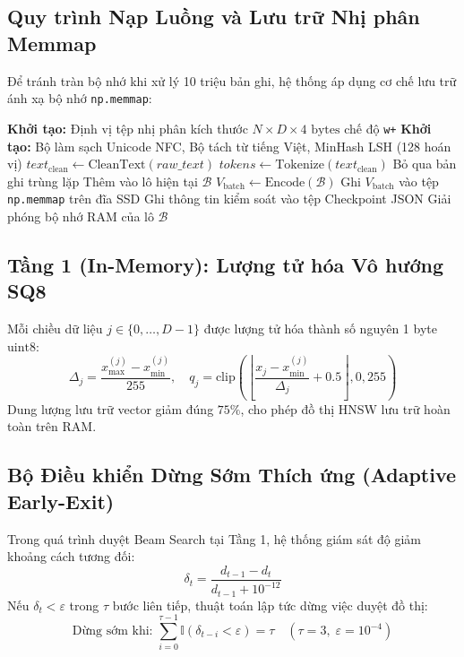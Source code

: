 \documentclass[12pt,a4paper]{article}
\begin{document}
\subsection{Quy trình Nạp Luồng và Lưu trữ Nhị phân Memmap}
Để tránh tràn bộ nhớ khi xử lý 10 triệu bản ghi, hệ thống áp dụng cơ chế lưu trữ ánh xạ bộ nhớ \texttt{np.memmap}:
\begin{algorithm}[H]
\caption{Quy trình Nạp Luồng và Ghi Đĩa Nhị phân Hằng số Bộ nhớ}
\begin{algorithmic}[1]
\State \textbf{Khởi tạo:} Định vị tệp nhị phân kích thước $N \times D \times 4\text{ bytes}$ chế độ \texttt{w+}
\State \textbf{Khởi tạo:} Bộ làm sạch Unicode NFC, Bộ tách từ tiếng Việt, MinHash LSH (128 hoán vị)
  \State $text_{\text{clean}} \gets \text{CleanText}(raw\_text)$
  \State $tokens \gets \text{Tokenize}(text_{\text{clean}})$
    \State Bỏ qua bản ghi trùng lặp
  \Else
    \State Thêm vào lô hiện tại $\mathcal{B}$
  \EndIf
    \State $V_{\text{batch}} \gets \text{Encode}(\mathcal{B})$
    \State Ghi $V_{\text{batch}}$ vào tệp \texttt{np.memmap} trên đĩa SSD
    \State Ghi thông tin kiểm soát vào tệp Checkpoint JSON
    \State Giải phóng bộ nhớ RAM của lô $\mathcal{B}$
  \EndIf
\EndWhile
\end{algorithmic}
\end{algorithm}

\subsection{Tầng 1 (In-Memory): Lượng tử hóa Vô hướng SQ8}
Mỗi chiều dữ liệu $j \in \{0, \dots, D-1\}$ được lượng tử hóa thành số nguyên 1 byte $\text{uint8}$:
\begin{equation}
\Delta_j = \frac{x_{\max}^{(j)} - x_{\min}^{(j)}}{255}, \quad q_j = \text{clip}\left( \left\lfloor \frac{x_j - x_{\min}^{(j)}}{\Delta_j} + 0.5 \right\rfloor, 0, 255 \right)
\end{equation}
Dung lượng lưu trữ vector giảm đúng $75\%$, cho phép đồ thị HNSW lưu trữ hoàn toàn trên RAM.

\subsection{Bộ Điều khiển Dừng Sớm Thích ứng (Adaptive Early-Exit)}
Trong quá trình duyệt Beam Search tại Tầng 1, hệ thống giám sát độ giảm khoảng cách tương đối:
\begin{equation}
\delta_t = \frac{d_{t-1} - d_t}{d_{t-1} + 10^{-12}}
\end{equation}
Nếu $\delta_t < \varepsilon$ trong $\tau$ bước liên tiếp, thuật toán lập tức dừng việc duyệt đồ thị:
\begin{equation}
\text{Dừng sớm khi: } \sum_{i=0}^{\tau-1} \mathbb{I}(\delta_{t-i} < \varepsilon) = \tau \quad (\tau = 3, \; \varepsilon = 10^{-4})
\end{equation}
\end{document}
